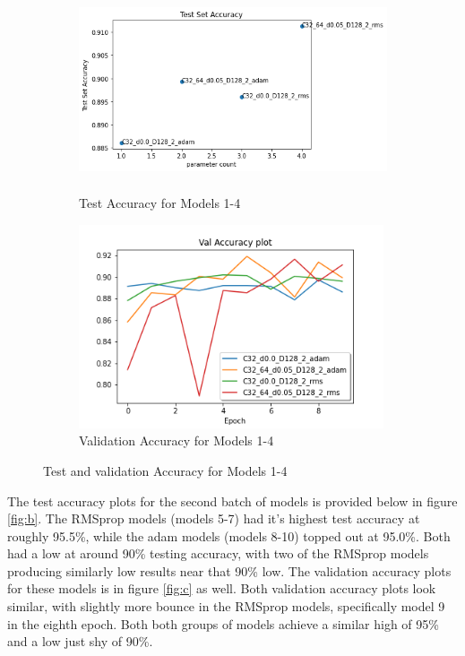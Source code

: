 \documentclass[twocolumn,letterpaper,10pt]{article}
\begin{document}
\begin{figure}[!h]

\begin{subfigure}{0.5\textwidth}
\includegraphics[width=0.9\linewidth, height=6cm]{Test_full.png} 
\caption{Test Accuracy for Models 1-4}
\label{fig:test}
\end{subfigure}
\begin{subfigure}{0.5\textwidth}
\includegraphics[width=0.9\linewidth, height=6cm]{Figure 1 - Validation Plot 1.png}
\caption{Validation Accuracy for Models 1-4}
\label{fig:val}
\end{subfigure}

\caption{Test and validation Accuracy for Models 1-4}
\label{fig:a}
\end{figure}

The test accuracy plots for the second batch of models is provided below in figure \ref{fig:b}. The RMSprop models (models 5-7) had it's highest test accuracy at roughly 95.5\%, while the adam models (models 8-10) topped out at 95.0\%. Both had a low at around 90\% testing accuracy, with two of the RMSprop models producing similarly low results near that 90\% low. The validation accuracy plots for these models is in figure \ref{fig:c} as well. Both validation accuracy plots look similar, with slightly more bounce in the RMSprop models, specifically model 9 in the eighth epoch. Both both groups of models achieve a similar high of 95\% and a low just shy of 90\%. 
\end{document}
